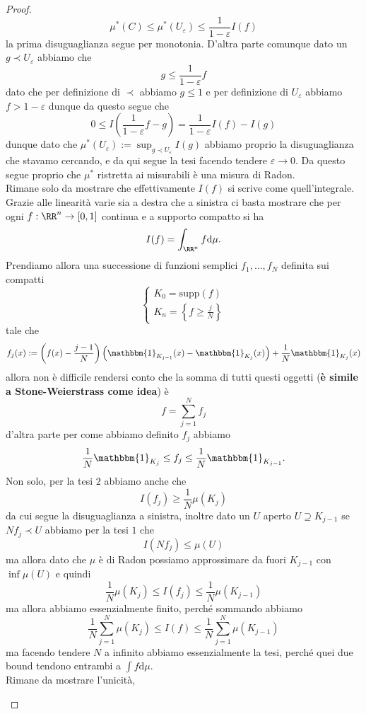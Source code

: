 \documentclass[11pt]{scrartcl}
\newcommand{\dif}{\text{d}}
\begin{document}
\begin{proof}
		$$\mu^*(C)\le \mu^*(U_\varepsilon)\le \frac{1}{1-\varepsilon}I(f)$$
		la prima disuguaglianza segue per monotonia. D'altra parte comunque dato un $g \prec U_\varepsilon$ abbiamo che 
		$$g\le \frac{1}{1-\varepsilon}f$$
		dato che per definizione di $\prec$ abbiamo $g\le 1$ e per definizione di $U_\varepsilon$ abbiamo $f>1-\varepsilon$ dunque da questo segue che 
		$$0\le I\left(\frac{1}{1-\varepsilon}f-g\right)=\frac{1}{1-\varepsilon}I(f)-I(g)$$
		dunque dato che $\mu^*(U_\varepsilon):=\sup_{g\prec U_\varepsilon}I(g)$ abbiamo proprio la disuguaglianza che stavamo cercando, e da qui segue la tesi facendo tendere $\varepsilon\to 0$. Da questo segue proprio che $\mu^*$ ristretta ai misurabili è una misura di Radon. \\
		Rimane solo da mostrare che effettivamente $I(f)$ si scrive come quell'integrale. Grazie alle linearità varie sia a destra che a sinistra ci basta mostrare che per ogni $f:\RR^n\to [0,1]$ continua e a supporto compatto si ha
		$$I(f)=\int_{\RR^n} f\dif \mu.$$
		Prendiamo allora una successione di funzioni semplici $f_1,\dots,f_N$ definita sui compatti 
		$$
		\begin{cases}
			K_0 = \text{supp}(f) \\
			K_n = \left\{f\ge \frac{j}{N}\right\}
		\end{cases}
		$$
		tale che
		$$f_j(x):=\left(f(x)-\frac{j-1}{N}\right)\left(\mathbbm{1}_{K_{j-1}}(x)-\mathbbm{1}_{K_j}(x)\right)+\frac{1}{N}\mathbbm{1}_{K_j}(x)$$
		allora non è difficile rendersi conto che la somma di tutti questi oggetti (\textbf{è simile a Stone-Weierstrass come idea}) è
		$$f=\sum_{j=1}^N f_j$$
		d'altra parte per come abbiamo definito $f_j$ abbiamo
		$$\frac{1}{N}\mathbbm{1}_{K_j}\le f_j\le \frac{1}{N}\mathbbm{1}_{K_{j-1}}.$$
		Non solo, per la tesi $2$ abbiamo anche che
		$$I(f_j)\ge \frac{1}{N}\mu(K_j)$$
		da cui segue la disuguaglianza a sinistra, inoltre dato un $U$ aperto $U\supseteq K_{j-1}$ se $Nf_j\prec U$ abbiamo per la tesi $1$ che 
		$$I(Nf_j)\le \mu(U)$$
		ma allora dato che $\mu$ è di Radon possiamo approssimare da fuori $K_{j-1}$ con $\inf \mu(U)$ e quindi
		$$\frac{1}{N}\mu(K_j)\le I(f_j)\le \frac{1}{N}\mu(K_{j-1})$$
		ma allora abbiamo essenzialmente finito, perché sommando abbiamo
		$$\frac{1}{N}\sum_{j=1}^N \mu(K_j)\le I(f)\le \frac{1}{N}\sum_{j=1}^{N}\mu(K_{j-1})$$
		ma facendo tendere $N$ a infinito abbiamo essenzialmente la tesi, perché quei due bound tendono entrambi a $\int f \dif \mu$. \\
		Rimane da mostrare l'unicità,
		\begin{claim}

\end{claim}
\end{proof}
\end{document}
